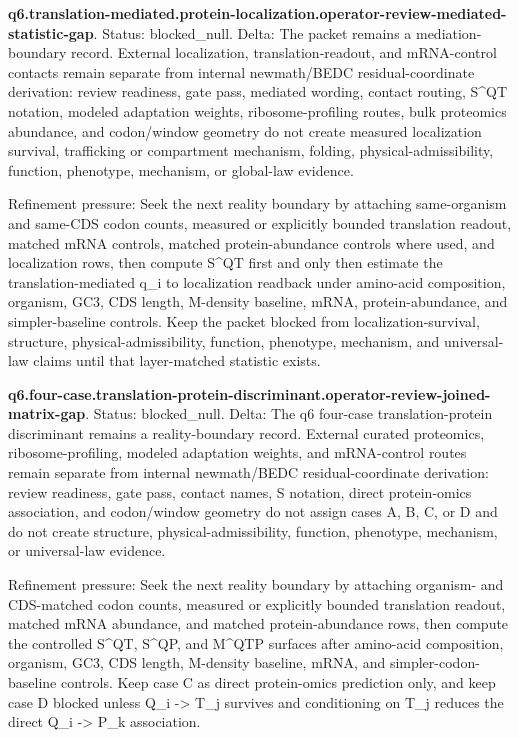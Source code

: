 \textbf{q6.translation-mediated.protein-localization.operator-review-mediated-statistic-gap}. Status: blocked\_null. Delta: The packet remains a mediation-boundary record. External localization, translation-readout, and mRNA-control contacts remain separate from internal newmath/BEDC residual-coordinate derivation: review readiness, gate pass, mediated wording, contact routing, S\textasciicircum{}QT notation, modeled adaptation weights, ribosome-profiling routes, bulk proteomics abundance, and codon/window geometry do not create measured localization survival, trafficking or compartment mechanism, folding, physical-admissibility, function, phenotype, mechanism, or global-law evidence.

Refinement pressure: Seek the next reality boundary by attaching same-organism and same-CDS codon counts, measured or explicitly bounded translation readout, matched mRNA controls, matched protein-abundance controls where used, and localization rows, then compute S\textasciicircum{}QT first and only then estimate the translation-mediated q\_i to localization readback under amino-acid composition, organism, GC3, CDS length, M-density baseline, mRNA, protein-abundance, and simpler-baseline controls. Keep the packet blocked from localization-survival, structure, physical-admissibility, function, phenotype, mechanism, and universal-law claims until that layer-matched statistic exists.

\textbf{q6.four-case.translation-protein-discriminant.operator-review-joined-matrix-gap}. Status: blocked\_null. Delta: The q6 four-case translation-protein discriminant remains a reality-boundary record. External curated proteomics, ribosome-profiling, modeled adaptation weights, and mRNA-control routes remain separate from internal newmath/BEDC residual-coordinate derivation: review readiness, gate pass, contact names, S notation, direct protein-omics association, and codon/window geometry do not assign cases A, B, C, or D and do not create structure, physical-admissibility, function, phenotype, mechanism, or universal-law evidence.

Refinement pressure: Seek the next reality boundary by attaching organism- and CDS-matched codon counts, measured or explicitly bounded translation readout, matched mRNA abundance, and matched protein-abundance rows, then compute the controlled S\textasciicircum{}QT, S\textasciicircum{}QP, and M\textasciicircum{}QTP surfaces after amino-acid composition, organism, GC3, CDS length, M-density baseline, mRNA, and simpler-codon-baseline controls. Keep case C as direct protein-omics prediction only, and keep case D blocked unless Q\_i -> T\_j survives and conditioning on T\_j reduces the direct Q\_i -> P\_k association.

